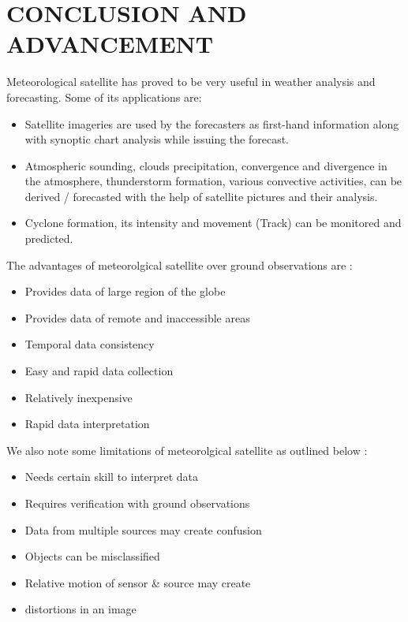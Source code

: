 \chapter*{\normalsize{\textbf{CONCLUSION AND ADVANCEMENT}}}
Meteorological satellite has proved to be very useful in weather analysis and forecasting.
Some of its applications are: 
\begin{itemize} 
\item Satellite imageries are used by the forecasters as first-hand information along with synoptic chart analysis while issuing the forecast.
\item Atmospheric sounding, clouds precipitation, convergence and divergence in the atmosphere, thunderstorm formation, various convective activities, can be derived / forecasted with the help of satellite pictures and their analysis. 
\item Cyclone formation, its intensity and movement (Track) can be monitored and predicted.
\end{itemize}
The advantages of meteorolgical satellite over ground observations  are :
\begin{itemize} 
\item Provides data of large region of the globe
\item Provides data of remote and inaccessible areas
\item Temporal data consistency 
\item Easy and rapid data collection
\item Relatively inexpensive
\item Rapid data interpretation
\end{itemize}
We also note some limitations of meteorolgical satellite as outlined below :
\begin{itemize} 
    \item Needs certain skill to interpret data
    \item Requires verification with ground observations
    \item Data from multiple sources may create confusion
    \item Objects can be misclassified
    \item Relative motion of sensor \& source may create 
    \item distortions in an image
\end{itemize}
